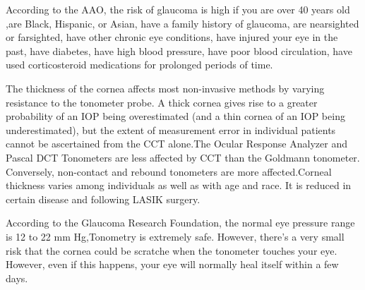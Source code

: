 \documentclass[12pt,A4paper]{article}
\begin{document}
According to the AAO, the risk of glaucoma is high if you are over 40 years old ,are Black, Hispanic, or Asian, have a family history of glaucoma, are nearsighted or farsighted, have other chronic eye conditions, have injured your eye in the past, have diabetes, have high blood pressure, have poor blood circulation, have used corticosteroid medications for prolonged periods of time.

The thickness of the cornea affects most non-invasive methods by varying resistance to the tonometer probe. A thick cornea gives rise to a greater probability of an IOP being overestimated (and a thin cornea of an IOP being underestimated), but the extent of measurement error in individual patients cannot be ascertained from the CCT alone.The Ocular Response Analyzer and Pascal DCT Tonometers are less affected by CCT than the Goldmann tonometer. Conversely, non-contact and rebound tonometers are more affected.Corneal thickness varies among individuals as well as with age and race. It is reduced in certain disease and following LASIK surgery.

According to the Glaucoma Research Foundation, the normal eye pressure range is 12 to 22 mm Hg,Tonometry is extremely safe. However, there’s a very small risk that the cornea could be scratche when the tonometer touches your eye. However, even if this happens, your eye will normally heal itself within a few days.
\end{document}
